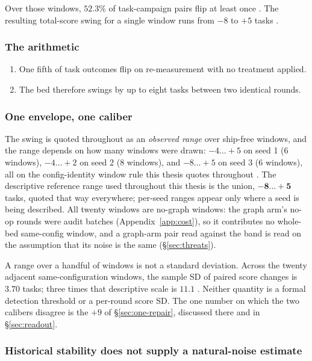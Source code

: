 Over those windows, $52.3\%$ of task-campaign pairs flip at least once .
The resulting total-score swing for a single window runs from $-8$ to
$+5$ tasks .

\subsubsection*{The arithmetic}

\begin{enumerate}
  \item One fifth of task outcomes flip on re-measurement with no treatment
        applied.
  \item The bed therefore swings by up to eight tasks between two
        identical rounds.
\end{enumerate}



\subsubsection*{One envelope, one caliber}

The swing is quoted throughout as an \emph{observed range} over ship-free
windows, and the range depends on how many windows were drawn:
$-4\ldots{+}5$ on seed 1 (6 windows), $-4\ldots{+}2$ on seed 2 (8
windows), and $-8\ldots{+}5$ on seed 3 (6 windows), all on the
config-identity window rule this thesis quotes throughout
.
The descriptive reference range used throughout this thesis is the union,
$\mathbf{-8\ldots{+}5}$ tasks, quoted that way everywhere; per-seed
ranges appear only where a seed is being described. All twenty windows
are no-graph windows: the graph arm's no-op rounds were audit batches
(Appendix~\ref{app:cost}), so it contributes no whole-bed same-config window, and a
graph-arm pair read against the band is read on the assumption that its
noise is the same (\S\ref{sec:threats}).

A range over a handful of windows is not a standard deviation. Across the
twenty adjacent same-configuration windows, the sample SD of paired score
changes is $\mathbf{3.70}$ tasks; three times that descriptive scale is
$11.1$ . Neither quantity is a formal detection threshold or a
per-round score SD. The one number on
which the two calibers disagree is the $+9$ of \S\ref{sec:one-repair},
discussed there and in \S\ref{sec:readout}.

\subsubsection*{Historical stability does not supply a natural-noise estimate}


